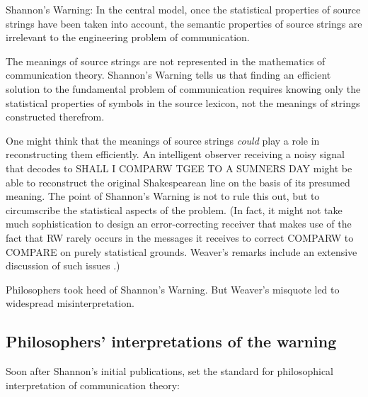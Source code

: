 \begin{myquote}
{\sc Shannon's Warning}: In the central model, once the statistical properties of source strings have been taken into account, the semantic properties of source strings are irrelevant to the engineering problem of communication.
\end{myquote}

\noindent 
The meanings of source strings are not represented in the mathematics of communication theory.
{\sc Shannon's Warning} tells us that finding an efficient solution to the fundamental problem of communication requires knowing only the statistical properties of symbols in the source lexicon, not the meanings of strings constructed therefrom.

One might think that the meanings of source strings \emph{could} play a role in reconstructing them efficiently.
An intelligent observer receiving a noisy signal that decodes to {\sc SHALL I COMPARW TGEE TO A SUMNERS DAY} might be able to reconstruct the original Shakespearean line on the basis of its presumed meaning.
The point of {\sc Shannon's Warning} is not to rule this out, but to circumscribe the statistical aspects of the problem.
(In fact, it might not take much sophistication to design an error-correcting receiver that makes use of the fact that {\sc RW} rarely occurs in the messages it receives to correct {\sc COMPARW} to {\sc COMPARE} on purely statistical grounds.
Weaver's remarks include an extensive discussion of such issues \citep[$\S$2]{shannon1949mathematical}.)

Philosophers took heed of {\sc Shannon's Warning}.
But Weaver's misquote led to widespread misinterpretation.

\subsection{Philosophers' interpretations of the warning}\label{subsec:warningPhil}

Soon after Shannon's initial publications, \citet{bar-hillel1953semantic} set the standard for philosophical interpretation of communication theory:

